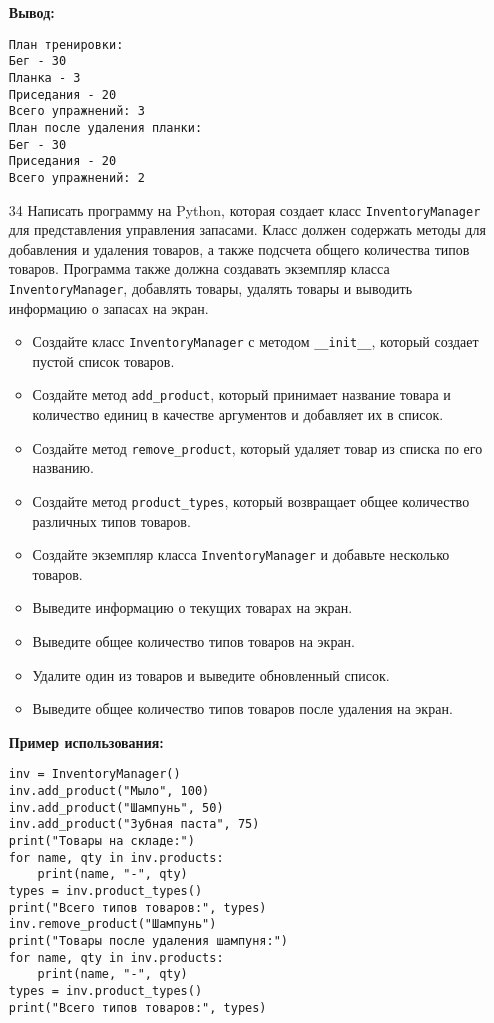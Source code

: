 \begin{enumerate}
\textbf{Вывод:}
\begin{verbatim}
План тренировки:
Бег - 30
Планка - 3
Приседания - 20
Всего упражнений: 3
План после удаления планки:
Бег - 30
Приседания - 20
Всего упражнений: 2
\end{verbatim}

\item[34] Написать программу на Python, которая создает класс \texttt{InventoryManager} для представления управления запасами. Класс должен содержать методы для добавления и удаления товаров, а также подсчета общего количества типов товаров. Программа также должна создавать экземпляр класса \texttt{InventoryManager}, добавлять товары, удалять товары и выводить информацию о запасах на экран.

\begin{itemize}
    \item Создайте класс \texttt{InventoryManager} с методом \texttt{\_\_init\_\_}, который создает пустой список товаров.
    \item Создайте метод \texttt{add\_product}, который принимает название товара и количество единиц в качестве аргументов и добавляет их в список.
    \item Создайте метод \texttt{remove\_product}, который удаляет товар из списка по его названию.
    \item Создайте метод \texttt{product\_types}, который возвращает общее количество различных типов товаров.
    \item Создайте экземпляр класса \texttt{InventoryManager} и добавьте несколько товаров.
    \item Выведите информацию о текущих товарах на экран.
    \item Выведите общее количество типов товаров на экран.
    \item Удалите один из товаров и выведите обновленный список.
    \item Выведите общее количество типов товаров после удаления на экран.
\end{itemize}

\textbf{Пример использования:}

\begin{verbatim}
inv = InventoryManager()
inv.add_product("Мыло", 100)
inv.add_product("Шампунь", 50)
inv.add_product("Зубная паста", 75)
print("Товары на складе:")
for name, qty in inv.products:
    print(name, "-", qty)
types = inv.product_types()
print("Всего типов товаров:", types)
inv.remove_product("Шампунь")
print("Товары после удаления шампуня:")
for name, qty in inv.products:
    print(name, "-", qty)
types = inv.product_types()
print("Всего типов товаров:", types)
\end{verbatim}


\end{enumerate}
